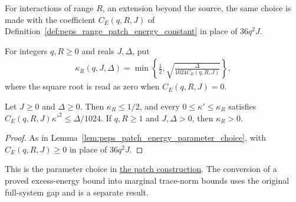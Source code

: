 For interactions of range $R$, an extension beyond the source, the same
choice is made with the coefficient $C_E(q,R,J)$ of
Definition~\ref{def:peps_range_patch_energy_constant} in place of $36q^2J$.

\begin{definition}
    \label{def:peps_range_patch_filter_exponent}
    \leanok
    For integers $q,R\ge0$ and reals $J,\Delta$, put
    \begin{align}
        \kappa_R(q,J,\Delta)=\min\left\{\frac12,
        \sqrt{\frac{\Delta}{1024C_E(q,R,J)}}\right\},
        \label{eq:peps_range_patch_filter_exponent}
    \end{align}
    where the square root is read as zero when $C_E(q,R,J)=0$.
\end{definition}

\begin{lemma}
    \label{lem:peps_range_patch_energy_parameter_choice}
    \leanok
    Let $J\ge0$ and $\Delta\ge0$. Then $\kappa_R\le1/2$, and every
    $0\le\kappa'\le\kappa_R$ satisfies $C_E(q,R,J)\kappa'^2\le\Delta/1024$.
    If $q,R\ge1$ and $J,\Delta>0$, then $\kappa_R>0$.
\end{lemma}
\begin{proof}
    \leanok
    As in Lemma~\ref{lem:peps_patch_energy_parameter_choice}, with
    $C_E(q,R,J)\ge0$ in place of $36q^2J$.
\end{proof}

This is the parameter choice in
\href{https://github.com/openai/math/blob/adc7f1241b42e322a6451854ab7e4b4c146bf78a/preprints/Polynomial-PEPS-approximation-of-gapped-square-grid-ground-states-September-24-2026/build/sections/03-patches.tex\#L339-L365}{the patch construction}.
The conversion of a proved excess-energy bound into marginal trace-norm
bounds uses the original full-system gap and is a separate result.
